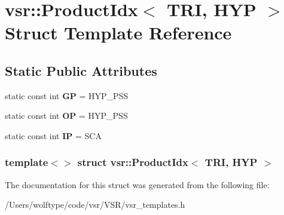 \hypertarget{structvsr_1_1_product_idx_3_01_t_r_i_00_01_h_y_p_01_4}{\section{vsr\-:\-:Product\-Idx$<$ T\-R\-I, H\-Y\-P $>$ Struct Template Reference}
\label{structvsr_1_1_product_idx_3_01_t_r_i_00_01_h_y_p_01_4}
}
\subsection*{Static Public Attributes}
\begin{DoxyCompactItemize}
\item 
\hypertarget{structvsr_1_1_product_idx_3_01_t_r_i_00_01_h_y_p_01_4_a814c6c79c28376ada82f1f0ee1946810}{static const int {\bfseries G\-P} = H\-Y\-P\-\_\-\-P\-S\-S}\label{structvsr_1_1_product_idx_3_01_t_r_i_00_01_h_y_p_01_4_a814c6c79c28376ada82f1f0ee1946810}

\item 
\hypertarget{structvsr_1_1_product_idx_3_01_t_r_i_00_01_h_y_p_01_4_adfef7ca38c41148517f51578145a9e20}{static const int {\bfseries O\-P} = H\-Y\-P\-\_\-\-P\-S\-S}\label{structvsr_1_1_product_idx_3_01_t_r_i_00_01_h_y_p_01_4_adfef7ca38c41148517f51578145a9e20}

\item 
\hypertarget{structvsr_1_1_product_idx_3_01_t_r_i_00_01_h_y_p_01_4_ad92ed2ea90028081460f617b027a29ca}{static const int {\bfseries I\-P} = S\-C\-A}\label{structvsr_1_1_product_idx_3_01_t_r_i_00_01_h_y_p_01_4_ad92ed2ea90028081460f617b027a29ca}

\end{DoxyCompactItemize}
\subsubsection*{template$<$$>$ struct vsr\-::\-Product\-Idx$<$ T\-R\-I, H\-Y\-P $>$}



The documentation for this struct was generated from the following file\-:\begin{DoxyCompactItemize}
\item 
/\-Users/wolftype/code/vsr/\-V\-S\-R/vsr\-\_\-templates.\-h\end{DoxyCompactItemize}
